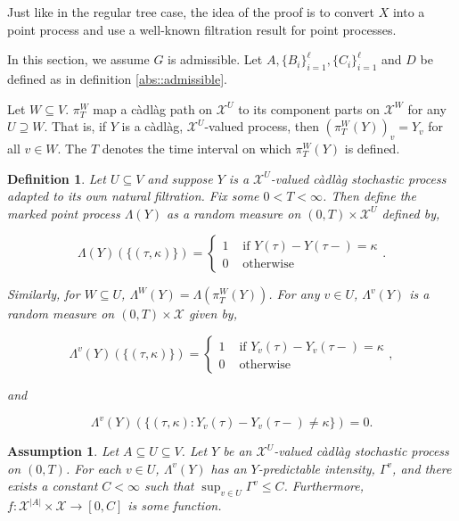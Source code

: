 \documentclass[12pt]{article}
\newcommand{\mc}{\mathcal}
\newcommand{\ra}{\rightarrow}
\newcommand{\te}{\text}
\newcommand{\ind}{\hspace{24pt}}
\newcommand{\Xf}{X}									%
\newcommand{\vcomp}[1]{_{#1}}						%
\newcommand{\tme}[1]{(#1)}							%
\newcommand{\stte}{\mc{X}}							%
\newcommand{\pmap}{\Lambda}
\newcommand{\proj}{\pi}
\newcommand{\rt}{\tau}
\renewcommand{\mark}{\kappa}
\newcommand{\Xg}{Y}
\newcommand{\ratee}{\Gamma}
\newtheorem{defn}[thms]{Definition}
\newtheorem{assu}[thms]{Assumption}
\begin{document}
Just like in the regular tree case, the idea of the proof is to convert \(\Xf\) into a point process and use a well-known filtration result for point processes.

\ind In this section, we assume \(G\) is admissible. Let \(A,\{B_i\}_{i=1}^\ell, \{C_i\}_{i=1}^\ell\) and \(D\) be defined as in definition \ref{abs::admissible}.

\ind Let \(W\subseteq V\). \(\proj^W_T\) map a c\`adl\`ag path on \(\stte^U\) to its component parts on \(\stte^W\) for any \(U \supseteq W\). That is, if \(\Xg\) is a c\`adl\`ag, \(\stte^U\)-valued process, then \((\proj^W_T(\Xg))\vcomp{v} = \Xg\vcomp{v}\) for all \(v \in W\). The \(T\) denotes the time interval on which \(\proj^W_T(\Xg)\) is defined.

\begin{defn}
Let \(U\subseteq V\) and suppose \(\Xg\) is a \(\stte^U\)-valued c\`adl\`ag stochastic process adapted to its own natural filtration. Fix some \(0 < T < \infty\). Then define the marked point process \(\pmap(\Xg)\) as a random measure on \((0,T) \times \stte^U\) defined by,

\[\pmap(\Xg)(\{(\rt,\mark)\}) = \begin{cases}
1 &\te{ if } \Xg\tme{\rt} - \Xg\tme{\rt-} = \mark\\
0 &\te{ otherwise}
\end{cases}.\]

Similarly, for \(W \subseteq U\), \(\pmap^W(\Xg) = \pmap\left(\proj^W_{T}(\Xg)\right)\). For any \(v\in U\), \(\pmap^{v}(\Xg)\) is a random measure on \((0,T) \times \stte\) given by,

\[\pmap^{v}(\Xg)(\{(\rt,\mark)\}) = \begin{cases}
1 &\te{ if } \Xg\vcomp{v}\tme{\rt} - \Xg\vcomp{v}\tme{\rt-} = \mark\\
0 &\te{ otherwise}
\end{cases},\]

and

\[\pmap^{v}(\Xg)(\{(\rt,\mark): \Xg\vcomp{v}\tme{\rt} - \Xg\vcomp{v}\tme{\rt-} \neq \mark\}) = 0.\]
\label{Ex::pmap}
\end{defn}

\begin{assu}
Let \(A\subseteq U \subseteq V\). Let \(\Xg\) be an \(\stte^U\)-valued c\`adl\`ag stochastic process on \((0,T)\). For each \(v\in U\), \(\pmap^{v}(\Xg)\) has an \(\Xg\)-predictable intensity, \(\ratee^{v}\), and there exists a constant \(C < \infty\) such that \(\sup_{v\in U} \ratee^{v} \leq C\). Furthermore, \(f: \stte^{|A|}\times \stte\ra[0,C]\) is some function.
\label{Ex::Eassu}
\end{assu}
\end{document}
